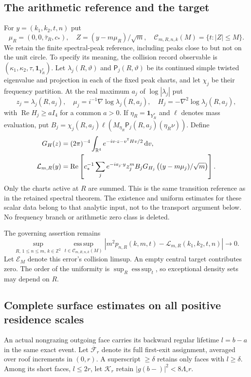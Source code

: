 \documentclass[11pt,reqno]{amsart}
\numberwithin{equation}{section}
\theoremstyle{definition}
\theoremstyle{remark}\newtheorem{remark}[theorem]{Remark}
\newcommand{\R}{\mathbb R}\newcommand{\Z}{\mathbb Z}
\newcommand{\one}{\mathbf1}\newcommand{\dd}{\,\mathrm d}
\newcommand{\esssup}{\operatorname*{ess\,sup}}
\begin{document}
\subsection{The arithmetic reference and the target}
For $y=(k_1,k_2,t,n)$ put
\[
 \mu_R=(0,0,\bar\tau_R,c_*),\quad
 Z=(y-m\mu_R)/\sqrt m,\quad
 \mathcal C_{m,R,n,k}(M)=\{t:|Z|\le M\}.
\]
We retain the finite spectral-peak reference, including peaks close to
but not on the unit circle. To specify its meaning, the collision
record observable is $(\kappa_1,\kappa_2,\tau,\one_{Y_R^*})$.
Let $\lambda_j(R,\vartheta)$ and $\mathsf P_j(R,\vartheta)$ be its
continued simple twisted eigenvalue and projection in each of the
fixed peak charts, and let $\chi_j$ be their frequency partition.
At the real maximum $a_j$ of $\log|\lambda_j|$ put
\[
 z_j=\lambda_j(R,a_j),\quad
 \mu_j=i^{-1}\nabla\log\lambda_j(R,a_j),\quad
 H_j=-\nabla^2\log\lambda_j(R,a_j),
\]
with $\operatorname{Re}H_j\ge aI_4$ for a common $a>0$. If
$\eta_R=\one_{Y_R^*}$ and $\ell$ denotes mass evaluation, put
$B_j=\chi_j(R,a_j)\ell(M_{\eta_R}\mathsf P_j(R,a_j)(\eta_R\nu))$.
Define
\begin{align}
 G_H(z)&=(2\pi)^{-4}\int_{\R^4}e^{-iv\cdot z-v^{\mathsf T}Hv/2}\dd v,
 \notag\\
 \mathcal L_{m,R}(y)&=\operatorname{Re}\left[
 c_*^{-1}\sum_j e^{-ia_j\cdot y}z_j^m B_j
      G_{H_j}\left((y-m\mu_j)/\sqrt m\right)\right].
 \label{eq:v76-reference}
\end{align}
Only the charts active at $R$ are summed. This is the same transition
reference as in the retained spectral theorem. The existence and
uniform estimates for these scalar data belong to that analytic
input, not to the transport argument below. No frequency branch or
arithmetic zero class is deleted.

The governing assertion remains
\begin{equation}\label{eq:v76-target}
 \sup_{R,\,1\le n\le m,\,k\in\Z^2}
 \esssup_{t\in\mathcal C_{m,R,n,k}(M)}
 |m^2p_{n,R}(k,m,t)-\mathcal L_{m,R}(k_1,k_2,t,n)|\longrightarrow0.
\end{equation}
Let $\mathcal E_M$ denote this error's collision limsup. An empty
central target contributes zero. The order of the uniformity is
$\sup_R\esssup_t$, so exceptional density sets may depend on $R$.

\subsection{Complete surface estimates on all positive residence scales}
An actual nongrazing outgoing face carries its backward regular lifetime
$l=b-a$ in the same exact event. Let $\overline{\mathcal F}_r$ denote
its full first-exit assignment, averaged over roof increments in $(0,r)$.
A superscript $\ge\delta$ retains only faces with $l\ge\delta$.
Among its short faces, $l\le2r$, let $\mathcal K_r$ retain
$|g(b-)|^2<8\Lambda_\circ r$.
\end{document}
